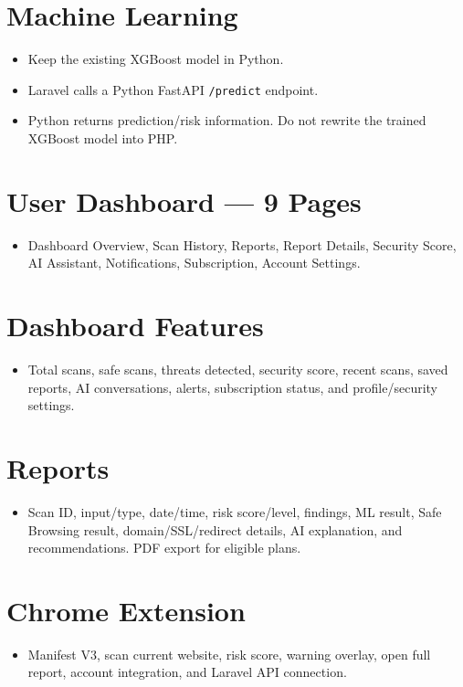 \documentclass[11pt,a4paper]{article}
\begin{document}
\section{Machine Learning}
\begin{itemize}[noitemsep]
    \item Keep the existing XGBoost model in Python.
    \item Laravel calls a Python FastAPI \texttt{/predict} endpoint.
    \item Python returns prediction/risk information. Do not rewrite the trained XGBoost model into PHP.
\end{itemize}

\section{User Dashboard — 9 Pages}
\begin{itemize}[noitemsep]
    \item Dashboard Overview, Scan History, Reports, Report Details, Security Score, AI Assistant, Notifications, Subscription, Account Settings.
\end{itemize}

\section{Dashboard Features}
\begin{itemize}[noitemsep]
    \item Total scans, safe scans, threats detected, security score, recent scans, saved reports, AI conversations, alerts, subscription status, and profile/security settings.
\end{itemize}

\section{Reports}
\begin{itemize}[noitemsep]
    \item Scan ID, input/type, date/time, risk score/level, findings, ML result, Safe Browsing result, domain/SSL/redirect details, AI explanation, and recommendations. PDF export for eligible plans.
\end{itemize}

\section{Chrome Extension}
\begin{itemize}[noitemsep]
    \item Manifest V3, scan current website, risk score, warning overlay, open full report, account integration, and Laravel API connection.
\end{itemize}
\end{document}

